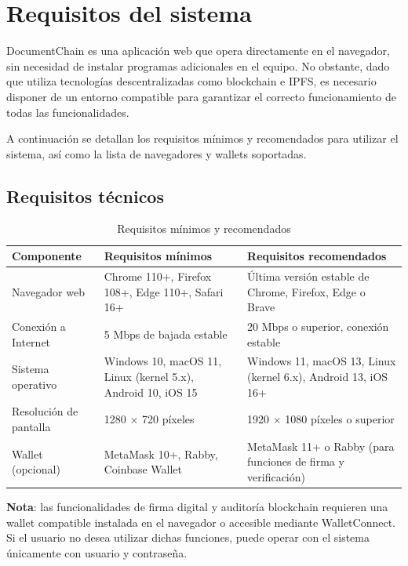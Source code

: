 \documentclass[11pt, a4paper]{article}
\begin{document}
\section{Requisitos del sistema}

DocumentChain es una aplicaci\'{o}n web que opera directamente en el navegador, sin necesidad de instalar programas adicionales en el equipo. No obstante, dado que utiliza tecnolog\'{i}as descentralizadas como blockchain e IPFS, es necesario disponer de un entorno compatible para garantizar el correcto funcionamiento de todas las funcionalidades.

A continuaci\'{o}n se detallan los requisitos m\'{i}nimos y recomendados para utilizar el sistema, as\'{i} como la lista de navegadores y wallets soportadas.

\subsection{Requisitos t\'{e}cnicos}

\begin{table}[H]
\centering
\caption{Requisitos m\'{i}nimos y recomendados}
\label{tab:requisitos}
\begin{tabular}{@{}p{4cm}p{5.5cm}p{5.5cm}@{}}
\toprule
\textbf{Componente} & \textbf{Requisitos m\'{i}nimos} & \textbf{Requisitos recomendados} \\
\midrule
Navegador web & Chrome 110+, Firefox 108+, Edge 110+, Safari 16+ & \'{U}ltima versi\'{o}n estable de Chrome, Firefox, Edge o Brave \\
Conexi\'{o}n a Internet & 5 Mbps de bajada estable & 20 Mbps o superior, conexi\'{o}n estable \\
Sistema operativo & Windows 10, macOS 11, Linux (kernel 5.x), Android 10, iOS 15 & Windows 11, macOS 13, Linux (kernel 6.x), Android 13, iOS 16+ \\
Resoluci\'{o}n de pantalla & 1280 $\times$ 720 p\'{i}xeles & 1920 $\times$ 1080 p\'{i}xeles o superior \\
Wallet (opcional) & MetaMask 10+, Rabby, Coinbase Wallet & MetaMask 11+ o Rabby (para funciones de firma y verificaci\'{o}n) \\
\bottomrule
\end{tabular}
\end{table}

\textbf{Nota}: las funcionalidades de firma digital y auditor\'{i}a blockchain requieren una wallet compatible instalada en el navegador o accesible mediante WalletConnect. Si el usuario no desea utilizar dichas funciones, puede operar con el sistema \'{u}nicamente con usuario y contrase\~{n}a.
\end{document}
